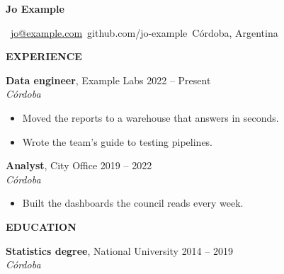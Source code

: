 \documentclass[10pt,a4paper]{article}
\newcommand{\header}[4]{%
  {\headingfont\fontsize{26}{30}\selectfont\bfseries #1}\par\medskip
  \faEnvelope\ \href{mailto:#2}{#2}\quad \faGithub\ #3\quad \faMapMarker*\ #4\par\bigskip}
\newcommand{\cvsection}[1]{{\headingfont\color{accent}\large\bfseries\MakeUppercase{#1}}\par\smallskip}
\newcommand{\job}[4]{\textbf{#1}, #2 \hfill {\color{accent}#3}\\\textit{#4}\par}
\newcommand{\point}[1]{\item #1}
\begin{document}
\header{Jo Example}{jo@example.com}{github.com/jo-example}{Córdoba, Argentina}

\cvsection{Experience}
\job{Data engineer}{Example Labs}{2022 -- Present}{Córdoba}
\begin{itemize}[leftmargin=12pt,nosep]
  \point{Moved the reports to a warehouse that answers in seconds.}
  \point{Wrote the team's guide to testing pipelines.}
\end{itemize}
\job{Analyst}{City Office}{2019 -- 2022}{Córdoba}
\begin{itemize}[leftmargin=12pt,nosep]
  \point{Built the dashboards the council reads every week.}
\end{itemize}

\cvsection{Education}
\job{Statistics degree}{National University}{2014 -- 2019}{Córdoba}
\end{document}
